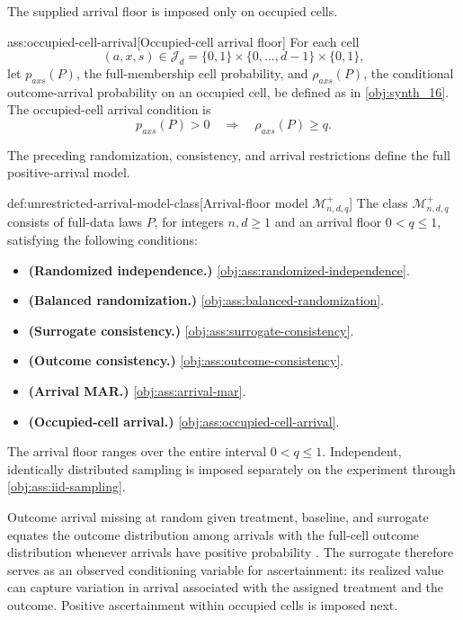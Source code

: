 The supplied arrival floor is imposed only on occupied cells.

\begin{assumptionv}{ass:occupied-cell-arrival}[Occupied-cell arrival floor]
For each cell
\[
(a,x,s)\in\mathcal J_d
=\{0,1\}\times\{0,\ldots,d-1\}\times\{0,1\},
\]
let \(p_{axs}(P)\), the full-membership cell probability, and \(\rho_{axs}(P)\), the conditional outcome-arrival probability on an occupied cell, be defined as in \cref{obj:synth_16}. The occupied-cell arrival condition is
\[
p_{axs}(P)>0
\quad\Longrightarrow\quad
\rho_{axs}(P)\ge q.
\]
\end{assumptionv}

The preceding randomization, consistency, and arrival restrictions define the full positive-arrival model.

\begin{definitionv}{def:unrestricted-arrival-model-class}[Arrival-floor model \(\mathcal M^{+}_{n,d,q}\)]
The class \(\mathcal M^{+}_{n,d,q}\) consists of full-data laws \(P\), for integers \(n,d\ge1\) and an arrival floor \(0<q\le1\), satisfying the following conditions:
\begin{itemize}
\item \textbf{(Randomized independence.)} \cref{obj:ass:randomized-independence}.
\item \textbf{(Balanced randomization.)} \cref{obj:ass:balanced-randomization}.
\item \textbf{(Surrogate consistency.)} \cref{obj:ass:surrogate-consistency}.
\item \textbf{(Outcome consistency.)} \cref{obj:ass:outcome-consistency}.
\item \textbf{(Arrival MAR.)} \cref{obj:ass:arrival-mar}.
\item \textbf{(Occupied-cell arrival.)} \cref{obj:ass:occupied-cell-arrival}.
\end{itemize}
The arrival floor ranges over the entire interval \(0<q\le1\). Independent, identically distributed sampling is imposed separately on the experiment through \cref{obj:ass:iid-sampling}.
\end{definitionv}

Outcome arrival missing at random given treatment, baseline, and surrogate equates the outcome distribution among arrivals with the full-cell outcome distribution whenever arrivals have positive probability \citep{Rubin1976,Robins1994,KallusMao2025}. The surrogate therefore serves as an observed conditioning variable for ascertainment: its realized value can capture variation in arrival associated with the assigned treatment and the outcome. Positive ascertainment within occupied cells is imposed next.

